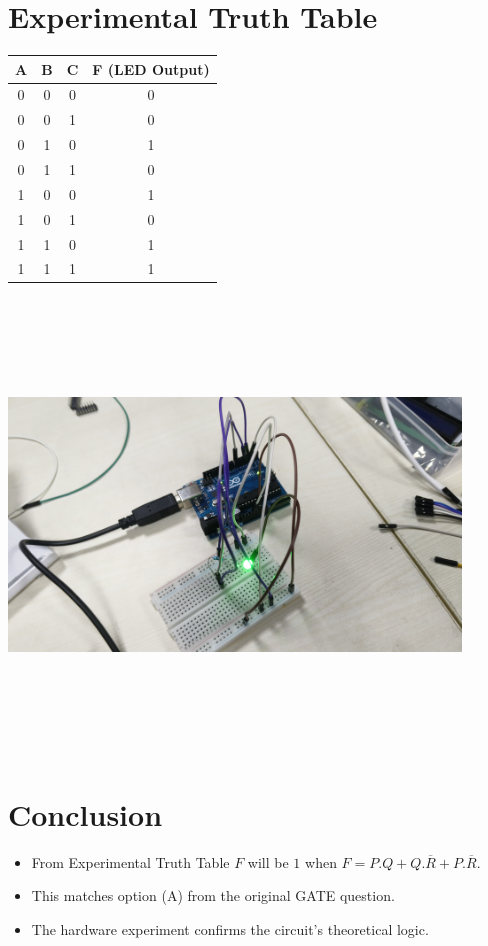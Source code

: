 \documentclass[a4paper,12pt]{article}
\begin{document}
\section*{Experimental Truth Table}
\begin{table}[H]
\centering
\begin{tabular}{|c|c|c|c|}
\hline
A & B & C & F (LED Output) \\ \hline
0 & 0 & 0 & 0 \\
0 & 0 & 1 & 0 \\
0 & 1 & 0 & 1 \\
0 & 1 & 1 & 0 \\
1 & 0 & 0 & 1 \\
1 & 0 & 1 & 0 \\
1 & 1 & 0 & 1 \\
1 & 1 & 1 & 1 \\
\hline
\end{tabular}
\end{table}
\begin{center}
	\includegraphics[width=12cm, height=12cm]{Output.jpg}
\end{center}
\section*{Conclusion}
\begin{itemize}
    	\item From Experimental Truth Table $F$ will be $1$ when $F=P.Q+Q.\overline{R}+P.\overline{R}$. 
	\item This matches option (A) from the original GATE question.
    	\item The hardware experiment confirms the circuit's theoretical logic.
\end{itemize}
\end{document}
